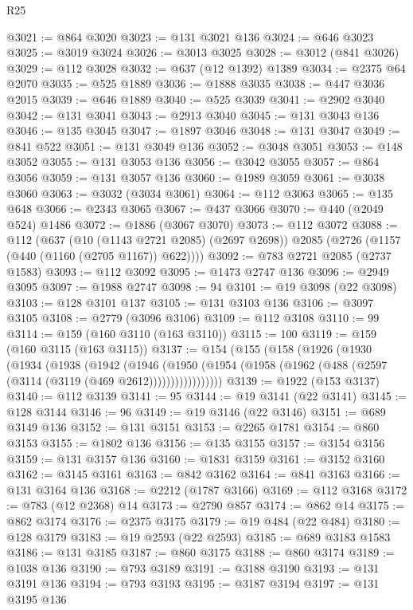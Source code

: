 \begin{lexlean}{R25}
\begin{coremodule}
{{{{{{{{{{{{{{{{{{{{{{{{{{{{{{{{{{{{{{{{{{{{{{{{{{{{{{{{{{{{{{{{{{{{{{{{{{{{{{{{{{{{{{{{{{{{{{{{{{{{{{{{{{{{{{{{{{{{{{{{{{{{{{{{{{{{{{{{{{{{{{{{{{{{{{{{{{{{{{{{{{{{{{{{{{{{{{{{{{{{{{{{{{{{{{{{{{{{{{{@3021 := @864 @3020
@3023 := @131 @3021 @136
@3024 := @646 @3023
@3025 := @3019 @3024
@3026 := @3013 @3025
@3028 := @3012 (@841 @3026)
@3029 := @112 @3028
@3032 := @637 (@12 @1392) @1389
@3034 := @2375 @64 @2070
@3035 := @525 @1889
@3036 := @1888 @3035
@3038 := @447 @3036 @2015
@3039 := @646 @1889
@3040 := @525 @3039
@3041 := @2902 @3040
@3042 := @131 @3041
@3043 := @2913 @3040
@3045 := @131 @3043 @136
@3046 := @135 @3045
@3047 := @1897 @3046
@3048 := @131 @3047
@3049 := @841 @522
@3051 := @131 @3049 @136
@3052 := @3048 @3051
@3053 := @148 @3052
@3055 := @131 @3053 @136
@3056 := @3042 @3055
@3057 := @864 @3056
@3059 := @131 @3057 @136
@3060 := @1989 @3059
@3061 := @3038 @3060
@3063 := @3032 (@3034 @3061)
@3064 := @112 @3063
@3065 := @135 @648
@3066 := @2343 @3065
@3067 := @437 @3066
@3070 := @440 (@2049 @524) @1486
@3072 := @1886 (@3067 @3070)
@3073 := @112 @3072
@3088 := @112
    (@637
      (@10 (@1143 @2721 @2085) (@2697 @2698))
      @2085
      (@2726 (@1157 (@440 (@1160 (@2705 @1167)) @622))))
@3092 := @783 @2721 @2085 (@2737 @1583)
@3093 := @112 @3092
@3095 := @1473 @2747 @136
@3096 := @2949 @3095
@3097 := @1988 @2747
@3098 := 94
@3101 := @19 @3098 (@22 @3098)
@3103 := @128 @3101 @137
@3105 := @131 @3103 @136
@3106 := @3097 @3105
@3108 := @2779 (@3096 @3106)
@3109 := @112 @3108
@3110 := 99
@3114 := @159 (@160 @3110 (@163 @3110))
@3115 := 100
@3119 := @159 (@160 @3115 (@163 @3115))
@3137 := @154
    (@155
      (@158
        (@1926
          (@1930
            (@1934
              (@1938
                (@1942
                  (@1946
                    (@1950
                      (@1954 (@1958 (@1962 (@488 (@2597 (@3114 (@3119 (@469 @2612)))))))))))))))))
@3139 := @1922 (@153 @3137)
@3140 := @112 @3139
@3141 := 95
@3144 := @19 @3141 (@22 @3141)
@3145 := @128 @3144
@3146 := 96
@3149 := @19 @3146 (@22 @3146)
@3151 := @689 @3149 @136
@3152 := @131 @3151
@3153 := @2265 @1781
@3154 := @860 @3153
@3155 := @1802 @136
@3156 := @135 @3155
@3157 := @3154 @3156
@3159 := @131 @3157 @136
@3160 := @1831 @3159
@3161 := @3152 @3160
@3162 := @3145 @3161
@3163 := @842 @3162
@3164 := @841 @3163
@3166 := @131 @3164 @136
@3168 := @2212 (@1787 @3166)
@3169 := @112 @3168
@3172 := @783 (@12 @2368) @14
@3173 := @2790 @857
@3174 := @862 @14
@3175 := @862 @3174
@3176 := @2375 @3175
@3179 := @19 @484 (@22 @484)
@3180 := @128 @3179
@3183 := @19 @2593 (@22 @2593)
@3185 := @689 @3183 @1583
@3186 := @131 @3185
@3187 := @860 @3175
@3188 := @860 @3174
@3189 := @1038 @136
@3190 := @793 @3189
@3191 := @3188 @3190
@3193 := @131 @3191 @136
@3194 := @793 @3193
@3195 := @3187 @3194
@3197 := @131 @3195 @136
}}}}}}}}}}}}}}}}}}}}}}}}}}}}}}}}}}}}}}}}}}}}}}}}}}}}}}}}}}}}}}}}}}}}}}}}}}}}}}}}}}}}}}}}}}}}}}}}}}}}}}}}}}}}}}}}}}}}}}}}}}}}}}}}}}}}}}}}}}}}}}}}}}}}}}}}}}}}}}}}}}}}}}}}}}}}}}}}}}}}}}}}}}}}}}}}}}}}}}}
\end{coremodule}
\end{lexlean}

